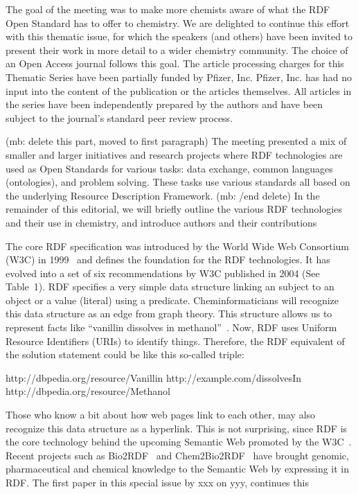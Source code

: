 \documentclass[10pt]{bmc_article}
\newenvironment{bmcformat}{\begin{raggedright}\baselineskip20pt\sloppy\setboolean{publ}{false}}{\end{raggedright}\baselineskip20pt\sloppy}
\begin{document}
\begin{bmcformat}
The goal of the meeting was to make more chemists aware of what the RDF Open
Standard has to offer to chemistry. We are delighted to continue this effort
with this thematic issue, for which the speakers (and others) have been invited
to present their work in more detail to a wider chemistry community. The choice
of an Open Access journal follows this goal. The article processing charges for
this Thematic Series have been partially funded by Pfizer, Inc.  Pfizer, Inc.
has had no input into the content of the publication or the articles themselves.
 All articles in the series have been independently prepared by the authors and
have been subject to the journal's standard peer review process.

(mb: delete this part, moved to first paragraph) The meeting presented a mix of
smaller and larger initiatives and research projects where RDF technologies are
used as Open Standards for various tasks: data exchange, common languages
(ontologies), and problem solving. These tasks use various standards all based
on the underlying Resource Description Framework. (mb: /end delete)  In the
remainder of this editorial, we will briefly outline the various RDF
technologies and their use in chemistry, and introduce authors and their
contributions  

The core RDF specification was introduced by the World Wide Web Consortium (W3C)
in 1999~\cite{RDF1999} and defines the foundation for the RDF technologies. It has
evolved into a set of six recommendations by W3C published in 2004
(See Table~1). 
RDF specifies a very simple data structure linking an subject to an object or a
value (literal) using a predicate. Cheminformaticians will recognize this data
structure as an edge from graph theory. This structure allows us to represent
facts like “vanillin dissolves in methanol”~\cite{ONS2010}. Now, RDF uses Uniform
Resource Identifiers (URIs) to identify things. Therefore, the RDF equivalent of
the solution statement could be like this so-called triple:

http://dbpedia.org/resource/Vanillin http://example.com/dissolvesIn http://dbpedia.org/resource/Methanol

Those who know a bit about how web pages link to each other, may also recognize
this data structure as a hyperlink. This is not surprising, since RDF is the
core technology behind the upcoming Semantic Web promoted by the
W3C~\cite{BER2001}. Recent projects such as Bio2RDF~\cite{BEL2008} and
Chem2Bio2RDF~\cite{CHE2010} have brought genomic, pharmaceutical and chemical knowledge to the
Semantic Web by expressing it in RDF. The first paper in this special issue by
xxx on yyy, continues this 


\end{bmcformat}
\end{document}
